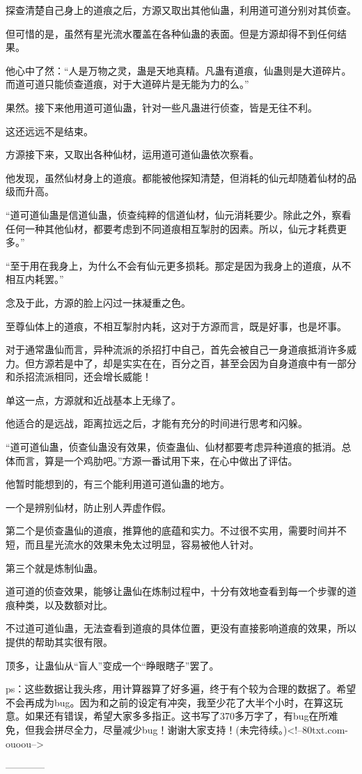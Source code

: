 \begin{this_body}
探查清楚自己身上的道痕之后，方源又取出其他仙蛊，利用道可道分别对其侦查。

但可惜的是，虽然有星光流水覆盖在各种仙蛊的表面。但是方源却得不到任何结果。

他心中了然：“人是万物之灵，蛊是天地真精。凡蛊有道痕，仙蛊则是大道碎片。而道可道只能侦查道痕，对于大道碎片是无能为力的么。”

果然。接下来他用道可道仙蛊，针对一些凡蛊进行侦查，皆是无往不利。

这还远远不是结束。

方源接下来，又取出各种仙材，运用道可道仙蛊依次察看。

他发现，虽然仙材身上的道痕。都能被他探知清楚，但消耗的仙元却随着仙材的品级而升高。

“道可道仙蛊是信道仙蛊，侦查纯粹的信道仙材，仙元消耗要少。除此之外，察看任何一种其他仙材，都要考虑到不同道痕相互掣肘的因素。所以，仙元才耗费更多。”

“至于用在我身上，为什么不会有仙元更多损耗。那定是因为我身上的道痕，从不相互内耗罢。”

念及于此，方源的脸上闪过一抹凝重之色。

至尊仙体上的道痕，不相互掣肘内耗，这对于方源而言，既是好事，也是坏事。

对于通常蛊仙而言，异种流派的杀招打中自己，首先会被自己一身道痕抵消许多威力。但方源若是中了，却是实实在在，百分之百，甚至会因为自身道痕中有一部分和杀招流派相同，还会增长威能！

单这一点，方源就和近战基本上无缘了。

他适合的是远战，距离拉远之后，才能有充分的时间进行思考和闪躲。

“道可道仙蛊，侦查仙蛊没有效果，侦查蛊仙、仙材都要考虑异种道痕的抵消。总体而言，算是一个鸡肋吧。”方源一番试用下来，在心中做出了评估。

他暂时能想到的，有三个能利用道可道仙蛊的地方。

一个是辨别仙材，防止别人弄虚作假。

第二个是侦查蛊仙的道痕，推算他的底蕴和实力。不过很不实用，需要时间并不短，而且星光流水的效果未免太过明显，容易被他人针对。

第三个就是炼制仙蛊。

道可道的侦查效果，能够让蛊仙在炼制过程中，十分有效地查看到每一个步骤的道痕种类，以及数额对比。

不过道可道仙蛊，无法查看到道痕的具体位置，更没有直接影响道痕的效果，所以提供的帮助其实很有限。

顶多，让蛊仙从“盲人”变成一个“睁眼瞎子”罢了。

ps：这些数据让我头疼，用计算器算了好多遍，终于有个较为合理的数据了。希望不会再成为bug。因为和之前的设定有冲突，我至少花了大半个小时，在算这玩意。如果还有错误，希望大家多多指正。这书写了370多万字了，有bug在所难免，但我会拼尽全力，尽量减少bug！谢谢大家支持！(未完待续。)<!--80txt.com-ouoou-->

------------

\end{this_body}

